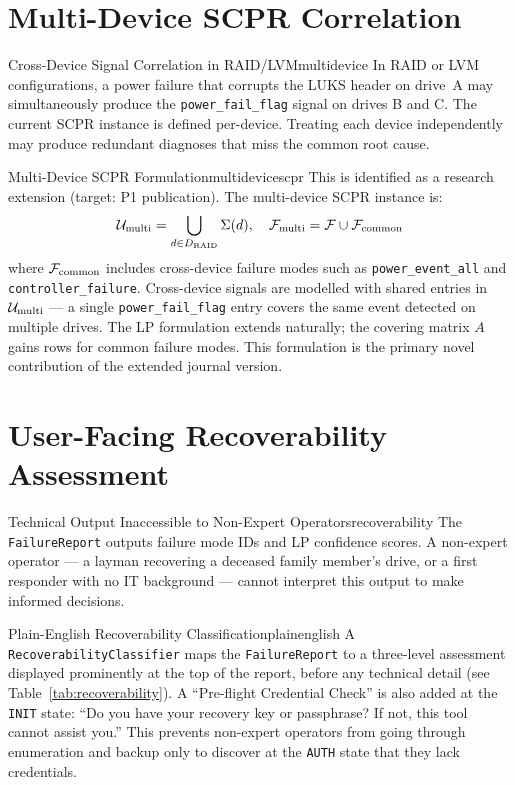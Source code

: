 \documentclass[11pt,a4paper]{report}
\newcommand{\calU}{\mathcal{U}}
\newcommand{\calF}{\mathcal{F}}
\begin{document}
\section{Multi-Device SCPR Correlation}

\begin{edgecase}{Cross-Device Signal Correlation in RAID/LVM}{multidevice}
In RAID or LVM configurations, a power failure that corrupts the LUKS header on drive~A may simultaneously produce the \texttt{power\_fail\_flag} signal on drives B and C. The current SCPR instance is defined per-device. Treating each device independently may produce redundant diagnoses that miss the common root cause.
\end{edgecase}

\begin{solution}{Multi-Device SCPR Formulation}{multidevicescpr}
This is identified as a research extension (target: P1 publication). The multi-device SCPR instance is:
\[
  \calU_{\rm multi} = \bigcup_{d \in D_{\rm RAID}} \Sigma(d), \quad \calF_{\rm multi} = \calF \cup \calF_{\rm common}
\]
where $\calF_{\rm common}$ includes cross-device failure modes such as \texttt{power\_event\_all} and \texttt{controller\_failure}. Cross-device signals are modelled with shared entries in $\calU_{\rm multi}$ --- a single \texttt{power\_fail\_flag} entry covers the same event detected on multiple drives. The LP formulation extends naturally; the covering matrix $A$ gains rows for common failure modes. This formulation is the primary novel contribution of the extended journal version.
\end{solution}

\section{User-Facing Recoverability Assessment}

\begin{edgecase}{Technical Output Inaccessible to Non-Expert Operators}{recoverability}
The \texttt{FailureReport} outputs failure mode IDs and LP confidence scores. A non-expert operator --- a layman recovering a deceased family member's drive, or a first responder with no IT background --- cannot interpret this output to make informed decisions.
\end{edgecase}

\begin{solution}{Plain-English Recoverability Classification}{plainenglish}
A \texttt{RecoverabilityClassifier} maps the \texttt{FailureReport} to a three-level assessment displayed prominently at the top of the report, before any technical detail (see Table~\ref{tab:recoverability}). A ``Pre-flight Credential Check'' is also added at the \texttt{INIT} state: ``Do you have your recovery key or passphrase? If not, this tool cannot assist you.'' This prevents non-expert operators from going through enumeration and backup only to discover at the \texttt{AUTH} state that they lack credentials.
\end{solution}
\end{document}
